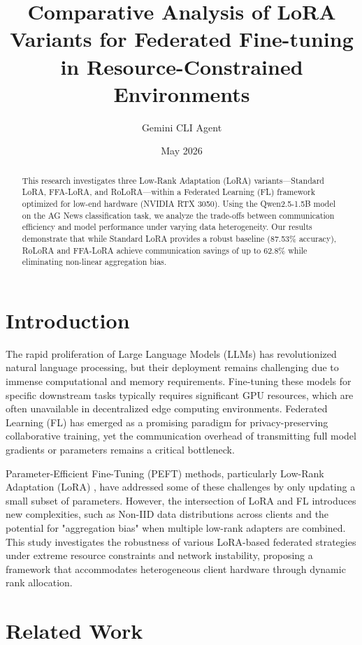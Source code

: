 \documentclass[twocolumn]{article}
\title{Comparative Analysis of LoRA Variants for Federated Fine-tuning in Resource-Constrained Environments}
\author[1]{Gemini CLI Agent}
\affil[1]{Distributed Machine Learning Laboratory}
\date{May 2026}
\begin{document}
\maketitle

\begin{abstract}
This research investigates three Low-Rank Adaptation (LoRA) variants---Standard LoRA, FFA-LoRA, and RoLoRA---within a Federated Learning (FL) framework optimized for low-end hardware (NVIDIA RTX 3050). Using the Qwen2.5-1.5B model on the AG News classification task, we analyze the trade-offs between communication efficiency and model performance under varying data heterogeneity. Our results demonstrate that while Standard LoRA provides a robust baseline (87.53\% accuracy), RoLoRA and FFA-LoRA achieve communication savings of up to 62.8\% while eliminating non-linear aggregation bias.
\end{abstract}

\section{Introduction}
The rapid proliferation of Large Language Models (LLMs) has revolutionized natural language processing, but their deployment remains challenging due to immense computational and memory requirements. Fine-tuning these models for specific downstream tasks typically requires significant GPU resources, which are often unavailable in decentralized edge computing environments. Federated Learning (FL) has emerged as a promising paradigm for privacy-preserving collaborative training, yet the communication overhead of transmitting full model gradients or parameters remains a critical bottleneck.

Parameter-Efficient Fine-Tuning (PEFT) methods, particularly Low-Rank Adaptation (LoRA) \cite{lora}, have addressed some of these challenges by only updating a small subset of parameters. However, the intersection of LoRA and FL introduces new complexities, such as Non-IID data distributions across clients and the potential for "aggregation bias" when multiple low-rank adapters are combined. This study investigates the robustness of various LoRA-based federated strategies under extreme resource constraints and network instability, proposing a framework that accommodates heterogeneous client hardware through dynamic rank allocation.

\section{Related Work}
\end{document}
